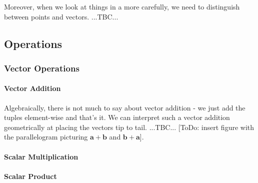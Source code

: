 
\medskip
Moreover, when we look at things in a more carefully, we need to distinguish between points and vectors. ...TBC...









\subsection{Operations}

\subsubsection{Vector Operations}

\paragraph{Vector Addition}
Algebraically, there is not much to say about vector addition - we just add the tuples element-wise and that's it. We can interpret such a vector addition geometrically at placing the vectors tip to tail. ...TBC... [ToDo: insert figure with the parallelogram picturing $\mathbf{a + b}$ and $\mathbf{b + a}$].

\paragraph{Scalar Multiplication}

\paragraph{Scalar Product}

